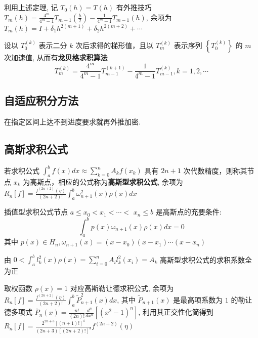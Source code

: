 \documentclass[10pt]{yerbaformat}
\begin{document}
\begin{definition}
    利用上述定理, 记 $T_{0}(h)=T(h)$ 有外推技巧 $T_{m}(h)=\frac{4^{m}}{4^{m}-1} T_{m-1}\left(\frac{h}{2}\right)-\frac{1}{4^{m}-1} T_{m-1}(h)$, 余项为 $T_{m}(h)=I+\delta_{1} h^{2(m+1)}+\delta_{2} h^{2(m+2)}+\cdots$
\end{definition}

\par 设以 $T_{0}^{(k)}$ 表示二分 $k$ 次后求得的梯形值，且以 $T_{m}^{(k)}$ 表示序列 $\left\{T_{0}^{(k)}\right\}$ 的 $m$ 次加速值, 从而有\textbf{龙贝格求积算法} $$
    T_{m}^{(k)}=\frac{4^{m}}{4^{m}-1} T_{m-1}^{(k+1)}-\frac{1}{4^{m}-1} T_{m-1}^{(k)}, k=1,2, \cdots
$$

\subsection{自适应积分方法}

\par 在指定区间上达不到进度要求就再外推加密.

\subsection{高斯求积公式}
\begin{definition}
    若求积公式 $\int_{a}^{b} f(x) d x \approx \sum_{k=0}^{n} A_{k} f\left(x_{k}\right)$ 具有 $2 n+1$ 次代数精度，则称其节点 $x_{k}$ 为高斯点，相应的公式称为\textbf{高斯型求积公式}, 余项为 $R_{n}[f]=\frac{f^{(2 n+2)}(\eta)}{(2 n+2) !} \int_{a}^{b} \omega_{n+1}^{2}(x) \rho(x) d x$
\end{definition}

\begin{theorem}
    插值型求积公式节点 $a \leq x_{0}<x_{1}<\cdots<$
    $x_{n} \leq b$ 是高斯点的充要条件:
    $$
        \int_{a}^{b} p(x) \omega_{n+1}(x) \rho(x) d x=0
    $$
    其中 $p(x) \in H_{n}, \omega_{n+1}(x)=\left(x-x_{0}\right)\left(x-x_{1}\right) \cdots\left(x-x_{n}\right)$
\end{theorem}

\begin{theorem}
    由 $0<\int_{a}^{b} l_{k}^{2}(x) \rho(x)=\sum_{i=0}^{n} A_{i} l_{k}^{2}\left(x_{i}\right)=A_{k}$ 高斯型求积公式的求积系数全为正
\end{theorem}

\begin{definition}
    取权函数 $\rho(x)=1$ 对应高斯勒让德求积公式, 余项为 $R_{n}[f]=\frac{f^{(2 n+2)}(\eta)}{(2 n+2) !} \int_{a}^{b} \tilde{P}_{n+1}^{2}(x) d x$, 其中 $\tilde{P}_{n+1}(x)$ 是最高项系数为 $1$ 的勒让德多项式 $\bar{P}_{n}(x)=\frac{n !}{(2 n) !} \frac{d^{n}}{d x^{n}}\left[\left(x^{2}-1\right)^{n}\right]$, 利用其正交性化简得到 $R_{n}[f]=\frac{2^{2 n+3}[(n+1) !]^{4}}{(2 n+3)[(2 n+2) !]^{3}} f^{(2 n+2)}(\eta)$
\end{definition}
\end{document}
